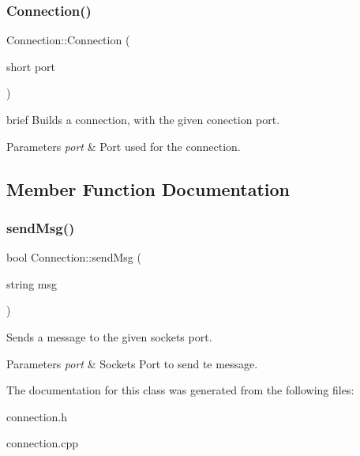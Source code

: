 \subsubsection{\texorpdfstring{Connection()}{Connection()}}
{\footnotesize\ttfamily Connection\+::\+Connection (\begin{DoxyParamCaption}\item[{short}]{port }\end{DoxyParamCaption})}

brief Builds a connection, with the given conection port. 
\begin{DoxyParams}{Parameters}
{\em port} & Port used for the connection. \\
\hline
\end{DoxyParams}


\subsection{Member Function Documentation}
\hypertarget{class_connection_a4b9f6db1fb42fc9857f829fa0bc52e6e}{}\label{class_connection_a4b9f6db1fb42fc9857f829fa0bc52e6e} 
\subsubsection{\texorpdfstring{send\+Msg()}{sendMsg()}}
{\footnotesize\ttfamily bool Connection\+::send\+Msg (\begin{DoxyParamCaption}\item[{string}]{msg }\end{DoxyParamCaption})}



Sends a message to the given socket\textquotesingle{}s port. 


\begin{DoxyParams}{Parameters}
{\em port} & Socket\textquotesingle{}s Port to send te message. \\
\hline
\end{DoxyParams}


The documentation for this class was generated from the following files\+:\begin{DoxyCompactItemize}
\item 
connection.\+h\item 
connection.\+cpp\end{DoxyCompactItemize}
